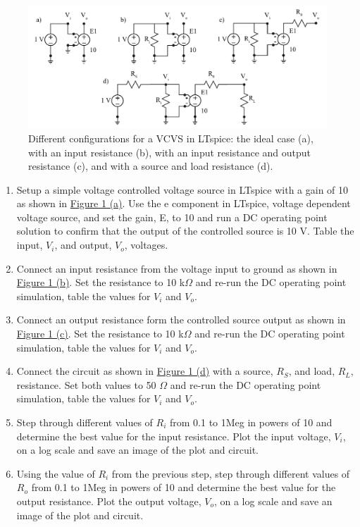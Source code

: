 \begin{figure} [h]
	\centering
		\includegraphics[width=1\textwidth]{Lab4ALTsource.pdf}
	\caption{Different configurations for a VCVS in LTspice: the ideal case (a), with an input resistance (b), with an input resistance and output resistance (c), and with a source and load resistance (d).} \label{fig:4sourcespice}
\end{figure}


\begin{enumerate}
	\item Setup a simple voltage controlled voltage source in LTspice with a gain of 10 as shown in \hyperref[fig:4sourcespice]{Figure \ref*{fig:4sourcespice} (a)}. Use the e component in LTspice, voltage dependent voltage source, and set the gain, E, to 10 and run a DC operating point solution to confirm that the output of the controlled source is 10 V. Table the input, $V_i$, and output, $V_o$, voltages. \label{itm:4ssec1itm1}
	\item Connect an input resistance from the voltage input to ground as shown in \hyperref[fig:4sourcespice]{Figure \ref*{fig:4sourcespice} (b)}. Set the resistance to 10 k$\Omega$ and re-run the DC operating point simulation, table the values for $V_i$ and $V_o$.
	\item Connect an output resistance form the controlled source output as shown in \hyperref[fig:4sourcespice]{Figure \ref*{fig:4sourcespice} (c)}. Set the resistance to 10 k$\Omega$ and re-run the DC operating point simulation, table the values for $V_i$ and $V_o$.
	\item Connect the circuit as shown in \hyperref[fig:4sourcespice]{Figure \ref*{fig:4sourcespice} (d)} with a source, $R_S$, and load, $R_L$, resistance. Set both values to 50 $\Omega$ and re-run the DC operating point simulation, table the values for $V_i$ and $V_o$. \label{itm:4ssec1itm4}
	\item Step through different values of $R_i$ from 0.1 to 1Meg in powers of 10 and determine the best value for the input resistance. Plot the input voltage, $V_i$, on a log scale and save an image of the plot and circuit. \label{itm:4ssec1itm5}
	\item Using the value of $R_i$ from the previous step, step through different values of $R_o$ from 0.1 to 1Meg in powers of 10 and determine the best value for the output resistance. Plot the output voltage, $V_o$, on a log scale and save an image of the plot and circuit. \label{itm:4ssec1itm6}
\end{enumerate}

